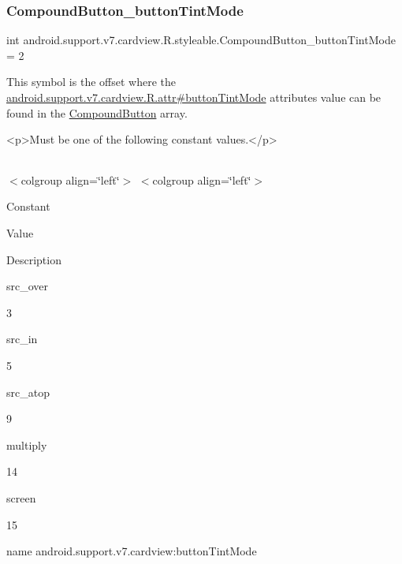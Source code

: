 \subsubsection{\texorpdfstring{Compound\+Button\+\_\+button\+Tint\+Mode}{CompoundButton\_buttonTintMode}}
{\footnotesize\ttfamily int android.\+support.\+v7.\+cardview.\+R.\+styleable.\+Compound\+Button\+\_\+button\+Tint\+Mode = 2\hspace{0.3cm}{\ttfamily [static]}}

This symbol is the offset where the \hyperlink{classandroid_1_1support_1_1v7_1_1cardview_1_1R_1_1attr_afeaf294e11b1d7a013c71a69de1adf7b}{android.\+support.\+v7.\+cardview.\+R.\+attr\#button\+Tint\+Mode} attribute\textquotesingle{}s value can be found in the \hyperlink{classandroid_1_1support_1_1v7_1_1cardview_1_1R_1_1styleable_a4e5dd24a739b20fb1bfbda95e04d1d75}{Compound\+Button} array.

\begin{DoxyVerb}      <p>Must be one of the following constant values.</p>
\end{DoxyVerb}
 \tabulinesep=1mm
\begin{longtabu} spread 0pt [c]{*{0}{|X[-1]}|}
\hline
\end{longtabu}
$<$colgroup align=\char`\"{}left\char`\"{}$>$ $<$colgroup align=\char`\"{}left\char`\"{}$>$ 

Constant

Value

Description 

{\ttfamily src\+\_\+over}

3

{\ttfamily src\+\_\+in}

5

{\ttfamily src\+\_\+atop}

9

{\ttfamily multiply}

14

{\ttfamily screen}

15

name android.\+support.\+v7.\+cardview\+:button\+Tint\+Mode \mbox{\label{classandroid_1_1support_1_1v7_1_1cardview_1_1R_1_1styleable_af6588adcd8d900f07f32f7bc3055e04d}} 
